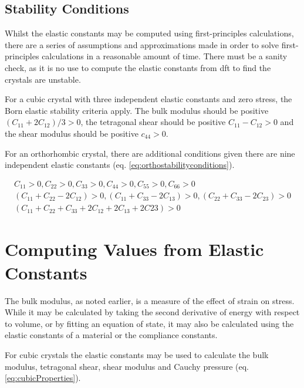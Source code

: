 \subsection{Stability Conditions}
\label{section:stabilityconditions}

Whilst the elastic constants may be computed using first-principles calculations, there are a series of assumptions and approximations made in order to solve first-principles calculations in a reasonable amount of time.  There must be a sanity check, as it is no use to compute the elastic constants from \acrshort{dft} to find the crystals are unstable.

For a cubic crystal with three independent elastic constants and zero stress, the Born elastic stability criteria apply\cite{acklandec}.  The bulk modulus should be positive $(C_{11}+2 C_{12}) / 3 > 0$, the tetragonal shear should be positive $C_{11} - C_{12} > 0$ and the shear modulus should be positive $c_{44} > 0$.

For an orthorhombic crystal, there are additional conditions given there are nine independent elastic constants (eq. \ref{eq:orthostabilityconditions})\cite{ghoshstability}.

\begin{equation}
\begin{split}
C_{11} > 0, C_{22} > 0, C_{33} > 0, C_{44} > 0, C_{55} > 0, C_{66} > 0 \\
(C_{11} + C_{22} - 2 C_{12}) > 0, (C_{11} + C_{33} - 2 C_{13}) > 0, (C_{22} + C_{33} - 2 C_{23}) > 0 \\
(C_{11} + C_{22} + C_{33} + 2 C_{12} + 2 C_{13} + 2 C{23}) > 0
\end{split}
\label{eq:orthostabilityconditions}
\end{equation}



\section{Computing Values from Elastic Constants}

The bulk modulus, as noted earlier, is a measure of the effect of strain on stress.  While it may be calculated by taking the second derivative of energy with respect to volume, or by fitting an equation of state, it may also be calculated using the elastic constants of a material or the compliance constants.

For cubic crystals the elastic constants may be used to calculate the bulk modulus, tetragonal shear, shear modulus and Cauchy pressure (eq. \ref{eq:cubicProperties}).

